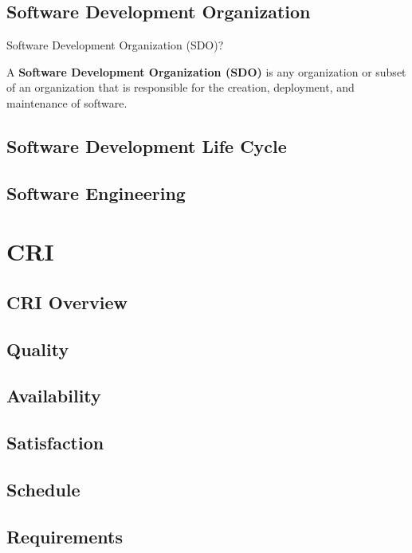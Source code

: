 \subsection{Software Development Organization}

\begin{frame}{Software Development Organization (SDO)?}
    \begin{displayquote}
         A \textbf{Software Development Organization (SDO)} is any
         organization or subset of an organization that is 
         responsible for the creation, deployment, and 
         maintenance of software. 
    \end{displayquote}
\end{frame}

\subsection[SDLC]{Software Development Life Cycle}

\subsection{Software Engineering}

\section{CRI}

    \subsection{CRI Overview}
    \subsection{Quality}
    \subsection{Availability}
    \subsection{Satisfaction}
    \subsection{Schedule}
    \subsection{Requirements}
